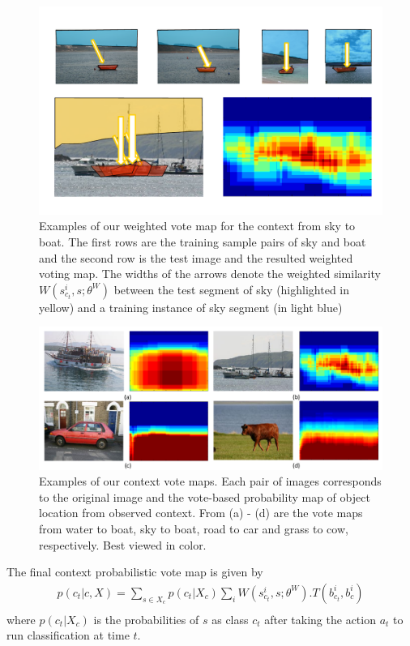 \begin{figure}[ht!]
\begin{center}
\includegraphics[width=0.6\linewidth]{figures/vote_sky_boat.pdf}
\end{center}
\caption{Examples of our weighted vote map for the context from sky to boat. The first rows are the training sample pairs of sky and boat and the second row is the test image and the resulted weighted voting map. The widths of the arrows denote the weighted similarity $W(s_{c_t}^i,s;\theta^W)$ between the test segment of sky (highlighted in yellow) and a training instance of sky segment (in light blue)}
\label{fig:vote_sky_boat}
\end{figure}


\begin{figure}[ht!]
\begin{center}
\includegraphics[width=0.6\linewidth]{figures/votemap.pdf}
\end{center}
\caption{Examples of our context vote maps. Each pair of images corresponds to the original image and the vote-based probability map of object location from observed context. From (a) - (d) are the vote maps from water to boat, sky to boat, road to car and grass to cow, respectively. Best viewed in color.}
\label{fig:votemap}
\end{figure}



The final context probabilistic vote map is given by
\begin{eqnarray}
p(c_t|c,X) = \sum_{s\in X_c} p(c_t|X_c)\sum_i W(s_{c_t}^i,s;\theta^W).T(b_{c_t}^i,b_c^i)\nonumber\\
\end{eqnarray}
where $p(c_t|X_c)$ is the probabilities of $s$ as class $c_t$ after taking the action $a_t$ to run classification at time $t$.


